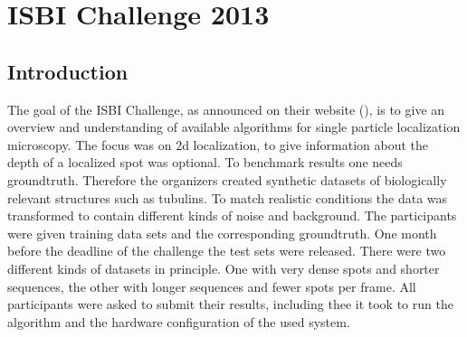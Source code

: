 \chapter{ISBI Challenge 2013}
\section{Introduction}
The goal of the ISBI Challenge, as announced on their website (\cite{challenge}), is to give an overview and understanding of available algorithms for single particle localization microscopy. The focus was on 2d localization, to give information about the depth of a localized spot was optional. To benchmark results one needs groundtruth. Therefore the organizers created synthetic datasets of biologically relevant structures such as tubulins. To match realistic conditions the data was transformed to contain different kinds of noise and background.\newline
The participants were given training data sets and the corresponding groundtruth. One month before the deadline of the challenge the test sets were released. There were two different kinds of datasets in principle. One with very dense spots and shorter sequences, the other with longer sequences and fewer spots per frame.\newline
All participants were asked to submit their results, including thee it took to run the algorithm and the hardware configuration of the used system.

